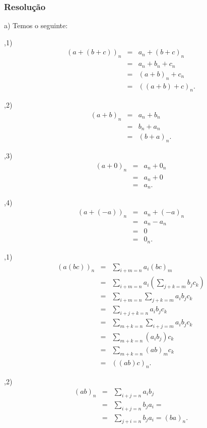 \documentclass[10pt,a4paper]{article}
\begin{document}
\subsubsection*{Resolução}

a) Temos o seguinte:

\smallskip
{},1)
\[
\begin{array}{rcl}
(a+(b+c))_n&=&a_n+(b+c)_n\\&=&a_n+b_n+c_n\\&=&(a+b)_n+c_n\\&=&((a+b)+c)_n.
\end{array}
\]

\smallskip
{},2)
\[
\begin{array}{rcl}
(a+b)_n&=&a_n+b_n\\&=&b_n+a_n\\&=&(b+a)_n.
\end{array}
\]

\smallskip
{},3)
\[
\begin{array}{rcl}
(a+0)_n&=&a_n+0_n\\&=&a_n+0\\&=&a_n.
\end{array}
\]

\smallskip
{},4)
\[
\begin{array}{rcl}
(a+(-a))_n&=&a_n+(-a)_n\\&=&a_n-a_n\\&=&0\\&=&0_n.
\end{array}
\]

\smallskip
{},1)
\[
\begin{array}{rcl}
(a(bc))_n&=&\sum_{i+m=n}a_i(bc)_m\\&=&\sum_{i+m=n}a_i\left(\sum_{j+k=m}b_jc_k\right)\\&=&\sum_{i+m=n}\sum_{j+k=m}a_ib_jc_k\\&=&\sum_{i+j+k=n}a_ib_jc_k\\&=&\sum_{m+k=n}\sum_{i+j=m}a_ib_jc_k\\&=&\sum_{m+k=n}\left(a_ib_j\right)c_k\\&=&\sum_{m+k=n}(ab)_mc_k\\&=&((ab)c)_n.
\end{array}
\]

\smallskip
{},2)
\[
\begin{array}{rcl}
(ab)_n&=&\sum_{i+j=n}a_ib_j\\&=&\sum_{i+j=n}b_ja_i=\\&=&\sum_{j+i=n}b_ja_i=(ba)_n.
\end{array}
\]
\end{document}
